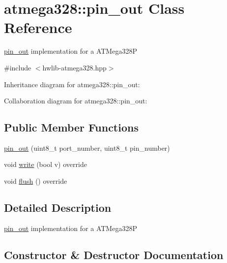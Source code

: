 \hypertarget{classatmega328_1_1pin__out}{}\section{atmega328\+:\+:pin\+\_\+out Class Reference}
\label{classatmega328_1_1pin__out}


\hyperlink{classatmega328_1_1pin__out}{pin\+\_\+out} implementation for a A\+T\+Mega328P  




{\ttfamily \#include $<$hwlib-\/atmega328.\+hpp$>$}



Inheritance diagram for atmega328\+:\+:pin\+\_\+out\+:


Collaboration diagram for atmega328\+:\+:pin\+\_\+out\+:
\subsection*{Public Member Functions}
\begin{DoxyCompactItemize}
\item 
\hyperlink{classatmega328_1_1pin__out_ae1a74e8262a4a52ebeddcebc042cca6f}{pin\+\_\+out} (uint8\+\_\+t port\+\_\+number, uint8\+\_\+t pin\+\_\+number)
\item 
void \hyperlink{classatmega328_1_1pin__out_ae95d42790e9d8d97fb372637bf3c76e6}{write} (bool v) override
\item 
void \hyperlink{classatmega328_1_1pin__out_a12371a15efd326dc559301a0751b899e}{flush} () override
\end{DoxyCompactItemize}


\subsection{Detailed Description}
\hyperlink{classatmega328_1_1pin__out}{pin\+\_\+out} implementation for a A\+T\+Mega328P 

\subsection{Constructor \& Destructor Documentation}
\mbox{\label{classatmega328_1_1pin__out_ae1a74e8262a4a52ebeddcebc042cca6f}} 
